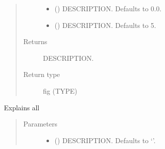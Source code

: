 \documentclass[letterpaper,10pt,english]{sphinxmanual}
\begin{document}
\begin{fulllineitems}
\begin{fulllineitems}
\begin{quote}
\begin{description}
\begin{itemize}
\item {} 
\sphinxAtStartPar
{} (\sphinxstyleliteralemphasis{\sphinxupquote{, }}) \textendash{} DESCRIPTION. Defaults to 0.0.

\item {} 
\sphinxAtStartPar
{} (\sphinxstyleliteralemphasis{\sphinxupquote{, }}) \textendash{} DESCRIPTION. Defaults to 5.

\end{itemize}

\item[{Returns}] \leavevmode
\sphinxAtStartPar
DESCRIPTION.

\item[{Return type}] \leavevmode
\sphinxAtStartPar
fig (TYPE)

\end{description}\end{quote}

\end{fulllineitems}


\begin{fulllineitems}
\label{\detokenize{index:modeldekom.totdif.explain_all}}
\pysigstartsignatures
{}
\pysigstopsignatures
\sphinxAtStartPar
Explains all
\begin{quote}\begin{description}
\item[{Parameters}] \leavevmode\begin{itemize}
\item {} 
\sphinxAtStartPar
{} (\sphinxstyleliteralemphasis{\sphinxupquote{, }}) \textendash{} DESCRIPTION. Defaults to ‘’.


\end{itemize}
\end{description}
\end{quote}
\end{fulllineitems}
\end{fulllineitems}
\end{document}
